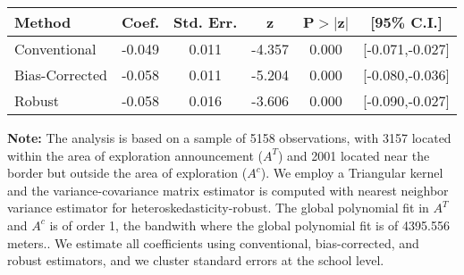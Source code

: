 \begin{table}[htbp]\centering
 \footnotesize 
\begin{tabular}{lccccc}
\hline\hline
Method & Coef. & Std. Err. & z & P$>|$z$|$ & [95\% C.I.] \\ 
\hline \hline  
Conventional & -0.049 & 0.011 & -4.357 & 0.000 & [-0.071,-0.027] \\ 
 Bias-Corrected & -0.058 & 0.011 & -5.204 & 0.000 & [-0.080,-0.036] \\ 
Robust & -0.058 & 0.016 & -3.606 & 0.000 & [-0.090,-0.027] \\ 
  \hline\hline
\end{tabular}
\label{table:rd}
\begin{tablenotes} 
  \justifying \tiny \textbf{Note: }    
   The analysis is based on a sample of 5158 observations, with 3157 located within the area of exploration announcement ($A^{T}$) and 2001 located near the border but outside the area of exploration  ($A^{c}$). 
           We employ a Triangular kernel and the variance-covariance matrix estimator is computed with nearest neighbor variance estimator for heteroskedasticity-robust. The global polynomial fit in  $A^{T}$ and $A^{c}$ is of order 1, the bandwith where the global polynomial fit is of 4395.556 meters.. We estimate all coefficients using conventional, bias-corrected, and robust estimators, and we cluster standard errors at the school level. \end{tablenotes} 
 \end{table} 
